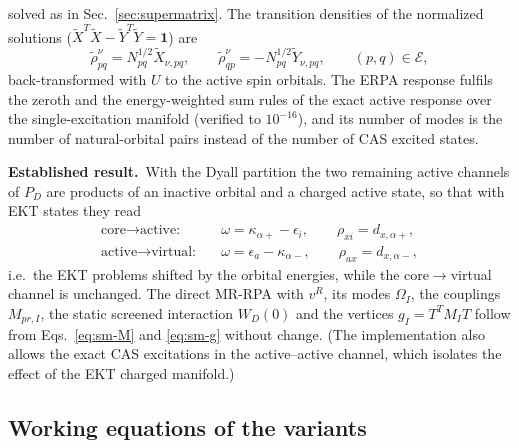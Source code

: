 \documentclass[aip,jcp,reprint,noshowkeys,superscriptaddress]{revtex4-1}
\newcommand{\Established}{\textbf{Established result.}\ }
\begin{document}
solved as in Sec.~\ref{sec:supermatrix}.  The transition densities of the
normalized solutions ($\tilde X^{T}\tilde X-\tilde Y^{T}\tilde Y=\mathbf 1$)
are
\begin{equation}
  \tilde\rho^{\nu}_{pq}=N_{pq}^{1/2}\tilde X_{\nu,pq},\qquad
  \tilde\rho^{\nu}_{qp}=-N_{pq}^{1/2}\tilde Y_{\nu,pq},\qquad (p,q)\in\mathcal E,
  \label{eq:erpa-rho}
\end{equation}
back-transformed with $U$ to the active spin orbitals.  The ERPA response
fulfils the zeroth and the energy-weighted sum rules of the exact active
response over the single-excitation manifold (verified to $10^{-16}$), and
its number of modes is the number of natural-orbital pairs instead of the
number of CAS excited states.

\Established With the Dyall partition the two remaining active channels of
$P_D$ are products of an inactive orbital and a charged active state, so
that with EKT states they read
\begin{align}
  \text{core}\to\text{active:}&\quad \omega=\kappa_{\alpha+}-\epsilon_i,\qquad \rho_{xi}=d_{x,\alpha+},
  \nonumber\\
  \text{active}\to\text{virtual:}&\quad \omega=\epsilon_a-\kappa_{\alpha-},\qquad \rho_{ax}=d_{x,\alpha-},
  \label{eq:ekt-channels}
\end{align}
i.e.\ the EKT problems shifted by the orbital energies, while the
core$\to$virtual channel is unchanged.  The direct MR-RPA with $v^R$, its
modes $\Omega_I$, the couplings $M_{pr,I}$, the static screened interaction
$W_D(0)$ and the vertices $g_I=T^{T}M_IT$ follow from Eqs.~\eqref{eq:sm-M}
and \eqref{eq:sm-g} without change.  (The implementation also allows the
exact CAS excitations in the active--active channel, which isolates the
effect of the EKT charged manifold.)

\subsection{Working equations of the variants}
\label{sec:ekt-working}
\end{document}
